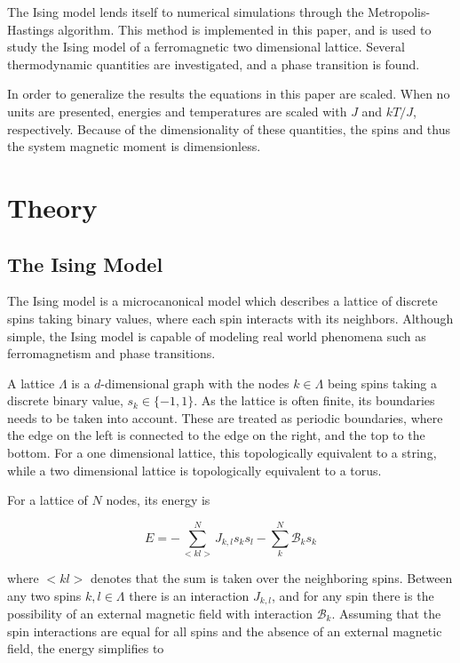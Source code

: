 \documentclass[aps,reprint]{revtex4-1}
\begin{document}
The Ising model lends itself to numerical simulations through the
Metropolis-Hastings algorithm. This method is implemented in this paper, and is
used to study the Ising model of a ferromagnetic two dimensional lattice.
Several thermodynamic quantities are investigated, and a phase transition is
found.


In order to generalize the results the equations in this paper are scaled.
When no units are presented, energies and temperatures are scaled with $J$ and
$kT/J$, respectively. Because of the dimensionality of these quantities, the spins
and thus the system magnetic moment is dimensionless.
\section{Theory}
\label{sec:theory}

\subsection{The Ising Model}
\label{sec:isingmodel}

The Ising model is a microcanonical model which describes a lattice of discrete spins taking binary values, where each
spin interacts with its neighbors. Although simple, the Ising model is capable of modeling real
world phenomena such as ferromagnetism and phase transitions.

A lattice \(\Lambda\) is a \(d\)-dimensional graph with the nodes \(k\in\Lambda\) being spins
taking a discrete binary value, \(s_{k}\in\{-1, 1\}\). As the lattice is often
finite, its boundaries needs to be taken into account. These are treated as
periodic boundaries, where the edge on the left is connected to the edge on the
right, and the top to the bottom. For a one dimensional lattice, this topologically equivalent
to a string, while a two dimensional lattice is topologically equivalent to a torus.

For a lattice of \(N\) nodes, its energy is

\begin{equation}
  \label{eq:2}
 E = -\sum_{<kl>}^{N}J_{k,l}s_{k}s_{l} - \sum_{k}^{N}\mathcal{B}_{k}s_{k}
\end{equation}

where \(<kl>\) denotes that the sum is taken over the neighboring spins.
Between any two spins \(k, l \in \Lambda\) there is an interaction \(J_{k,l}\),
and for any spin there is the possibility of an external magnetic field with
interaction \(\mathcal{B}_{k}\). Assuming that the spin interactions are equal
for all spins and the absence of an external magnetic field, the energy
simplifies to
\end{document}
